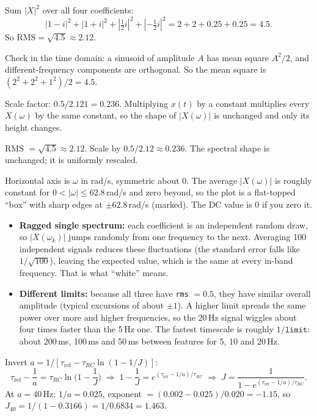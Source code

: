 \documentclass[10pt,letterpaper]{article}
\newcommand{\tref}{\tau_{\mathrm{ref}}}
\newcommand{\trc}{\tau_{RC}}
\newcommand{\qsec}[1]{\vspace{8pt}{\large\bfseries #1}\par\vspace{2pt}}
\newcommand{\ans}[1]{\par\vspace{3pt}{\bfseries #1}\quad}
\begin{document}
\ans{1d.}
Sum $|X|^2$ over all four coefficients:
\[
|1-i|^2 + |1+i|^2 + |\tfrac12 i|^2 + |-\tfrac12 i|^2 = 2 + 2 + 0.25 + 0.25 = 4.5.
\]
So $\mathrm{RMS} = \sqrt{4.5} \approx 2.12$.

Check in the time domain: a sinusoid of amplitude $A$ has mean square $A^2/2$, and different-frequency components are orthogonal. So the mean square is $(2^2 + 2^2 + 1^2)/2 = 4.5$. \checkmark

Scale factor: $0.5/2.121 = 0.236$. Multiplying $x(t)$ by a constant multiplies every $X(\omega)$ by the same constant, so the shape of $|X(\omega)|$ is unchanged and only its height changes.
\begin{result}
RMS $= \sqrt{4.5} \approx 2.12$. Scale by $0.5/2.12 \approx 0.236$. The spectral shape is unchanged; it is uniformly rescaled.
\end{result}

\ans{1e.}
\begin{sketch}
Horizontal axis is $\omega$ in rad/s, symmetric about 0. The average $|X(\omega)|$ is roughly constant for $0 < |\omega| \le 62.8$\,rad/s and zero beyond, so the plot is a flat-topped ``box'' with sharp edges at $\pm 62.8$\,rad/s (marked). The DC value is 0 if you zero it.
\end{sketch}
\begin{itemize}[leftmargin=1.5em,itemsep=1pt]
\item \textbf{Ragged single spectrum:} each coefficient is an independent random draw, so $|X(\omega_k)|$ jumps randomly from one frequency to the next. Averaging 100 independent signals reduces these fluctuations (the standard error falls like $1/\sqrt{100}$), leaving the expected value, which is the same at every in-band frequency. That is what ``white'' means.
\item \textbf{Different limits:} because all three have \texttt{rms} $= 0.5$, they have similar overall amplitude (typical excursions of about $\pm 1$). A higher limit spreads the same power over more and higher frequencies, so the 20\,Hz signal wiggles about four times faster than the 5\,Hz one. The fastest timescale is roughly $1/\texttt{limit}$: about 200\,ms, 100\,ms and 50\,ms between features for 5, 10 and 20\,Hz.
\end{itemize}

\qsec{2. A single spiking LIF neuron}

\ans{2a.}
Invert $a = 1/[\tref - \trc\ln(1-1/J)]$:
\[
\tref - \frac1a = \trc\ln\!\Big(1 - \frac1J\Big) \;\Rightarrow\; 1 - \frac1J = e^{(\tref - 1/a)/\trc} \;\Rightarrow\; J = \frac{1}{1 - e^{(\tref - 1/a)/\trc}}.
\]
At $a = 40$\,Hz: $1/a = 0.025$, exponent $= (0.002 - 0.025)/0.020 = -1.15$, so
$J_{40} = 1/(1 - 0.3166) = 1/0.6834 = 1.463$.
\end{document}
